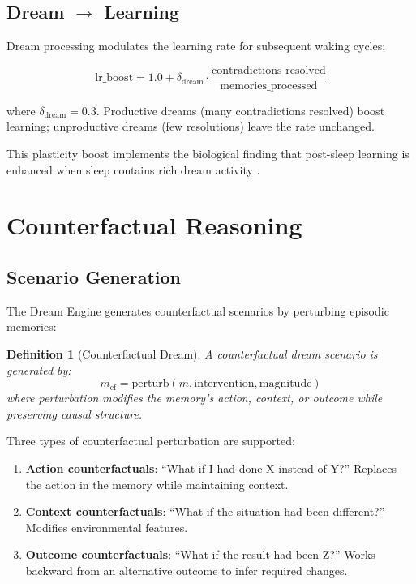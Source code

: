 \documentclass[11pt,a4paper]{article}
\newtheorem{definition}{Definition}
\begin{document}
\subsection{Dream $\to$ Learning}

Dream processing modulates the learning rate for subsequent waking cycles:

\begin{equation}
\text{lr\_boost} = 1.0 + \delta_{\text{dream}} \cdot \frac{\text{contradictions\_resolved}}{\text{memories\_processed}}
\end{equation}

where $\delta_{\text{dream}} = 0.3$. Productive dreams (many contradictions resolved) boost learning; unproductive dreams (few resolutions) leave the rate unchanged.

This plasticity boost implements the biological finding that post-sleep learning is enhanced when sleep contains rich dream activity \citep{mednick2003}.

\section{Counterfactual Reasoning}

\subsection{Scenario Generation}

The Dream Engine generates counterfactual scenarios by perturbing episodic memories:

\begin{definition}[Counterfactual Dream]
A counterfactual dream scenario is generated by:
\begin{equation}
m_{\text{cf}} = \text{perturb}(m, \text{intervention}, \text{magnitude})
\end{equation}
where perturbation modifies the memory's action, context, or outcome while preserving causal structure.
\end{definition}

Three types of counterfactual perturbation are supported:

\begin{enumerate}[nosep]
    \item \textbf{Action counterfactuals}: ``What if I had done X instead of Y?'' Replaces the action in the memory while maintaining context.
    \item \textbf{Context counterfactuals}: ``What if the situation had been different?'' Modifies environmental features.
    \item \textbf{Outcome counterfactuals}: ``What if the result had been Z?'' Works backward from an alternative outcome to infer required changes.
\end{enumerate}
\end{document}
